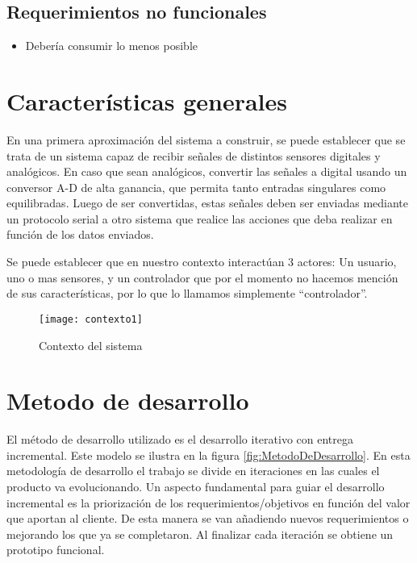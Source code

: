 
\subsection{Requerimientos no funcionales} %
\label{sub:requerimientos_no_funcionales}

\begin{itemize}
	\item Debería consumir lo menos posible
\end{itemize}



\section{Características generales} %
\label{sec:caracteristicas_generales}

En una primera aproximación del sistema a construir, se puede establecer que se trata de un sistema capaz de recibir señales de distintos sensores digitales y analógicos. En caso que sean analógicos, convertir las señales a digital usando un conversor A-D de alta ganancia, que permita tanto entradas singulares como equilibradas. Luego de ser convertidas, estas señales deben ser enviadas mediante un protocolo serial a otro sistema que realice las acciones que deba realizar en función de los datos enviados.

Se puede establecer que en nuestro contexto interactúan 3 actores: Un usuario, uno o mas sensores, y un controlador que por el momento no hacemos mención de sus características, por lo que lo llamamos simplemente ``controlador''.

\begin{figure}[h]
  \centering
  \texttt{[image: contexto1]}
  \caption{Contexto del sistema}\label{fig:contexto1}
\end{figure}


\section{Metodo de desarrollo} %
\label{sec:metodo_de_desarrollo}

El método de desarrollo utilizado es el desarrollo iterativo con entrega incremental. Este modelo se ilustra en la figura \ref{fig:MetodoDeDesarrollo}. En esta metodología de desarrollo el trabajo se divide en iteraciones en las cuales el producto va evolucionando. 
Un aspecto fundamental para guiar el desarrollo incremental es la priorización de los requerimientos/objetivos en función del valor que aportan al cliente. De esta manera se van añadiendo nuevos requerimientos o mejorando los que ya se completaron. Al finalizar cada iteración se obtiene un prototipo funcional.

